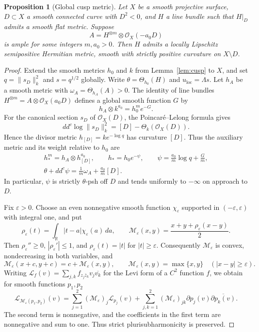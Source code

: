 \documentclass[11pt]{amsart}
\newtheorem{proposition}[theorem]{Proposition}
\theoremstyle{definition}
\theoremstyle{remark}
\numberwithin{equation}{section}
\newcommand{\R}{\mathbb R}
\newcommand{\OO}{\mathcal O}
\newcommand{\ddc}{dd^c}
\newcommand{\Levi}{\mathcal L}
\begin{document}
\begin{proposition}[Global cusp metric]\label{prop:global-cusp}
Let $X$ be a smooth projective surface, $D\subset X$ a smooth
connected curve with $D^2<0$, and $H$ a line bundle such that
$H|_D$ admits a smooth flat metric. Suppose
\[
 A=H^{\otimes m}\otimes\OO_X(-a_0D)
\]
is ample for some integers $m,a_0>0$. Then $H$ admits a
locally Lipschitz semipositive Hermitian metric, smooth with
strictly positive curvature on $X\setminus D$.
\end{proposition}
\begin{proof}
Extend the smooth metrics $h_0$ and $k$ from Lemma~\ref{lem:cusp}
to $X$, and set $q=\|s_D\|_k^2$ and $s=q^{1/2}$ globally.
Write $\theta=\Theta_{h_0}(H)$ and $u_{\mathrm{loc}}=\Lambda s$.
Let $h_A$ be a smooth metric
with $\omega_A=\Theta_{h_A}(A)>0$. The identity of line bundles
$H^{\otimes m}=A\otimes\OO_X(a_0D)$ defines a global smooth
function $G$ by
\[
 h_A\otimes k^{a_0}=h_0^m e^{-G}.
\]
For the canonical section $s_D$ of $\OO_X(D)$, the
Poincar\'e--Lelong formula gives
\begin{equation}\label{eq:PL}
 \ddc\log\|s_D\|_k^2=[D]-\Theta_k(\OO_X(D)).
\end{equation}
Hence the divisor metric $h_{[D]}=ke^{-\log q}$ has curvature $[D]$.
Thus the auxiliary metric and its weight relative to $h_0$ are
\begin{equation}\label{eq:log-curvature}
 \begin{gathered}
 h_*^m=h_A\otimes h_{[D]}^{a_0},\qquad
 h_*=h_0e^{-\psi},\qquad
 \psi=\frac{a_0}{m}\log q+\frac Gm,\\
 \theta+\ddc\psi=\frac1m\omega_A+\frac{a_0}{m}[D].
 \end{gathered}
\end{equation}
In particular, $\psi$ is strictly $\theta$-psh off $D$ and
tends uniformly to $-\infty$ on approach to $D$.

Fix $\varepsilon>0$. Choose an even nonnegative smooth function
$\chi_\varepsilon$ supported in $(-\varepsilon,\varepsilon)$
with integral one, and put
\[
 \rho_\varepsilon(t)=\int_\R|t-a|\chi_\varepsilon(a)\,da,
 \qquad
 \mathcal M_\varepsilon(x,y)=
       \frac{x+y+\rho_\varepsilon(x-y)}2.
\]
Then $\rho_\varepsilon''\ge0$, $|\rho_\varepsilon'|\le1$,
and $\rho_\varepsilon(t)=|t|$ for $|t|\ge\varepsilon$.
Consequently $\mathcal M_\varepsilon$ is convex,
nondecreasing in both variables, and
\[
 \mathcal M_\varepsilon(x+c,y+c)=c+\mathcal M_\varepsilon(x,y),
 \qquad
 \mathcal M_\varepsilon(x,y)=\max\{x,y\}\quad
                  (|x-y|\ge\varepsilon).
\]
Writing $\Levi_f(v)=\sum_{j,k} f_{z_j\bar z_k}v_j\overline{v_k}$
for the Levi form of a $C^2$ function $f$, we obtain for smooth
functions $p_1,p_2$
\[
 \Levi_{\mathcal M_\varepsilon(p_1,p_2)}(v)
 =\sum_{j=1}^2(\mathcal M_\varepsilon)_j\Levi_{p_j}(v)
  +\sum_{j,k=1}^2(\mathcal M_\varepsilon)_{jk}
       \partial p_j(v)\overline{\partial p_k(v)}.
\]
The second term is nonnegative, and the coefficients in the
first term are nonnegative and sum to one. Thus strict
plurisubharmonicity is preserved.


\end{proof}
\end{document}
